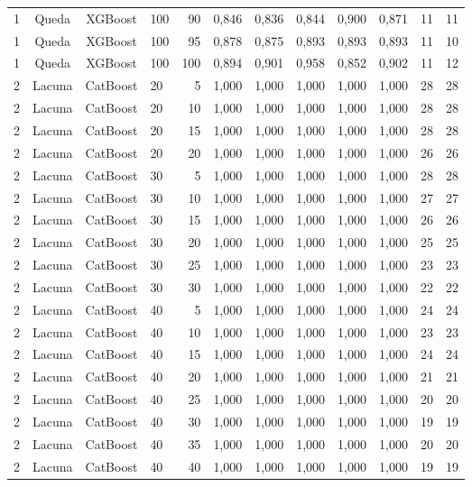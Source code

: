 \begin{longtable}{ccclrrrrrrrr}
1 & Queda & XGBoost & 100 & 90 & 0,846 & 0,836 & 0,844 & 0,900 & 0,871 & 11 & 11 \\
1 & Queda & XGBoost & 100 & 95 & 0,878 & 0,875 & 0,893 & 0,893 & 0,893 & 11 & 10 \\
1 & Queda & XGBoost & 100 & 100 & 0,894 & 0,901 & 0,958 & 0,852 & 0,902 & 11 & 12 \\
2 & Lacuna & CatBoost & 20 & 5 & 1,000 & 1,000 & 1,000 & 1,000 & 1,000 & 28 & 28 \\
2 & Lacuna & CatBoost & 20 & 10 & 1,000 & 1,000 & 1,000 & 1,000 & 1,000 & 28 & 28 \\
2 & Lacuna & CatBoost & 20 & 15 & 1,000 & 1,000 & 1,000 & 1,000 & 1,000 & 28 & 28 \\
2 & Lacuna & CatBoost & 20 & 20 & 1,000 & 1,000 & 1,000 & 1,000 & 1,000 & 26 & 26 \\
2 & Lacuna & CatBoost & 30 & 5 & 1,000 & 1,000 & 1,000 & 1,000 & 1,000 & 28 & 28 \\
2 & Lacuna & CatBoost & 30 & 10 & 1,000 & 1,000 & 1,000 & 1,000 & 1,000 & 27 & 27 \\
2 & Lacuna & CatBoost & 30 & 15 & 1,000 & 1,000 & 1,000 & 1,000 & 1,000 & 26 & 26 \\
2 & Lacuna & CatBoost & 30 & 20 & 1,000 & 1,000 & 1,000 & 1,000 & 1,000 & 25 & 25 \\
2 & Lacuna & CatBoost & 30 & 25 & 1,000 & 1,000 & 1,000 & 1,000 & 1,000 & 23 & 23 \\
2 & Lacuna & CatBoost & 30 & 30 & 1,000 & 1,000 & 1,000 & 1,000 & 1,000 & 22 & 22 \\
2 & Lacuna & CatBoost & 40 & 5 & 1,000 & 1,000 & 1,000 & 1,000 & 1,000 & 24 & 24 \\
2 & Lacuna & CatBoost & 40 & 10 & 1,000 & 1,000 & 1,000 & 1,000 & 1,000 & 23 & 23 \\
2 & Lacuna & CatBoost & 40 & 15 & 1,000 & 1,000 & 1,000 & 1,000 & 1,000 & 24 & 24 \\
2 & Lacuna & CatBoost & 40 & 20 & 1,000 & 1,000 & 1,000 & 1,000 & 1,000 & 21 & 21 \\
2 & Lacuna & CatBoost & 40 & 25 & 1,000 & 1,000 & 1,000 & 1,000 & 1,000 & 20 & 20 \\
2 & Lacuna & CatBoost & 40 & 30 & 1,000 & 1,000 & 1,000 & 1,000 & 1,000 & 19 & 19 \\
2 & Lacuna & CatBoost & 40 & 35 & 1,000 & 1,000 & 1,000 & 1,000 & 1,000 & 20 & 20 \\
2 & Lacuna & CatBoost & 40 & 40 & 1,000 & 1,000 & 1,000 & 1,000 & 1,000 & 19 & 19 \\

\end{longtable}
